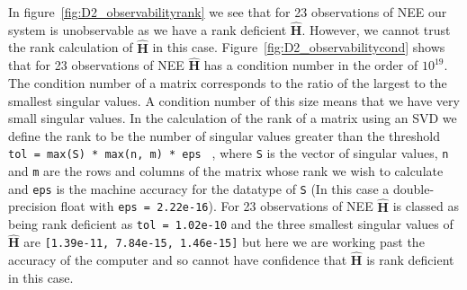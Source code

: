 \documentclass[11pt]{article}
\begin{document}
In figure~\ref{fig:D2_observabilityrank} we see that for 23 observations of NEE our system is unobservable as we have a rank deficient $\hat{\textbf{H}}$. However, we cannot trust the rank calculation of $\hat{\textbf{H}}$ in this case. Figure~\ref{fig:D2_observabilitycond} shows that for 23 observations of NEE $\hat{\textbf{H}}$ has a condition number in the order of $10^{19}$. The condition number of a matrix corresponds to the ratio of the largest to the smallest singular values. A condition number of this size means that we have very small singular values. In the calculation of the rank of a matrix using an SVD we define the rank to be the number of singular values greater than the threshold \texttt{ tol = max(S) * max(n, m) * eps } \citep{press2007numerical}, where \texttt{S} is the vector of singular values, \texttt{n} and \texttt{m} are the rows and columns of the matrix whose rank we wish to calculate and \texttt{eps} is the machine accuracy for the datatype of \texttt{S} (In this case a double-precision float with \texttt{eps = 2.22e-16}). For 23 observations of NEE $\hat{\textbf{H}}$ is classed as being rank deficient as \texttt{tol = 1.02e-10} and the three smallest singular values of $\hat{\textbf{H}}$ are \texttt{[1.39e-11, 7.84e-15, 1.46e-15]} but here we are working past the accuracy of the computer and so cannot have confidence that $\hat{\textbf{H}}$ is rank deficient in this case.
\end{document}

